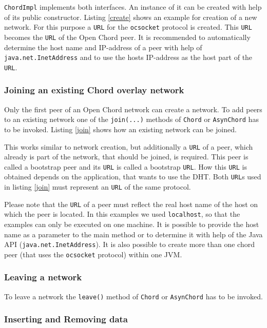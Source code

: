 {\tt ChordImpl} implements both interfaces. An instance of it can be created with help of its public constructor. Listing \ref{create} shows an example for creation of a new 
network. For this purpose a {\tt URL} for the {\tt ocsocket} protocol is created. 
This {\tt URL} becomes the {\tt URL} of the Open Chord peer. It is recommended to 
automatically determine the host name and IP-address of a peer with help of 
{\tt java.net.InetAddress} and to use the hosts IP-address as the host part of 
the {\tt URL}. 

\subsubsection{Joining an existing Chord overlay network} 

Only the first peer of an Open Chord network can create a network. To add peers 
to an existing network one of the {\tt join(...)} methods of {\tt Chord} or 
{\tt AsynChord} has to be invoked. Listing \ref{join} shows how an existing 
network can be joined. 


This works similar to network creation, but additionally a {\tt URL} of 
a peer, which already is part of the network, that should be joined, is required. 
This peer is called a bootstrap peer and its {\tt URL} is called a bootstrap 
{\tt URL}. How this {\tt URL} is obtained depends on the application, that wants 
to use the DHT. Both {\tt URL}s used in listing \ref{join} must represent an 
{\tt URL} of the same protocol. 

Please note that the {\tt URL} of a peer must reflect the real host name of the host 
on which the peer is located. In this examples we used {\tt localhost}, so that the examples 
can only be executed on one machine. It is possible to provide the host name as a parameter 
to the main method or to determine it with help of the Java API ({\tt java.net.InetAddress}). 
It is also possible to create more than one chord peer (that uses the {\tt ocsocket} protocol) 
within one JVM. 

\subsubsection{Leaving a network}  
To leave a network the {\tt leave()} method of {\tt Chord} or {\tt AsynChord} has 
to be invoked. 

\subsubsection{Inserting and Removing data} 

